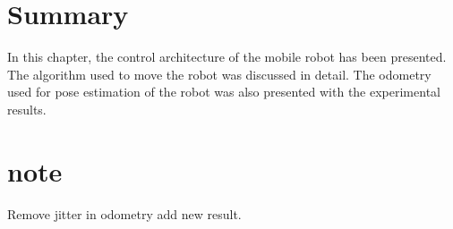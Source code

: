 

\section{Summary}
In this chapter, the control architecture of the mobile robot has been presented. The  algorithm used  to move the robot was discussed in detail. The odometry used for pose estimation of the robot was also presented with the experimental results. 

\section{note}

Remove jitter in odometry add new result.
